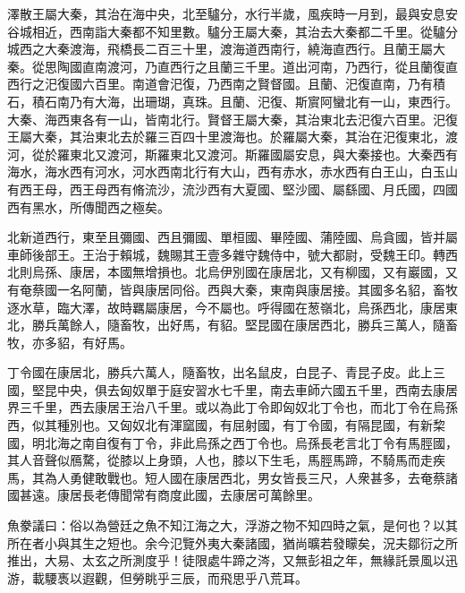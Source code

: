 \begin{pinyinscope}
澤散王屬大秦，其治在海中央，北至驢分，水行半歲，風疾時一月到，最與安息安谷城相近，西南詣大秦都不知里數。驢分王屬大秦，其治去大秦都二千里。從驢分城西之大秦渡海，飛橋長二百三十里，渡海道西南行，繞海直西行。且蘭王屬大秦。從思陶國直南渡河，乃直西行之且蘭三千里。道出河南，乃西行，從且蘭復直西行之汜復國六百里。南道會汜復，乃西南之賢督國。且蘭、汜復直南，乃有積石，積石南乃有大海，出珊瑚，真珠。且蘭、汜復、斯賔阿蠻北有一山，東西行。大秦、海西東各有一山，皆南北行。賢督王屬大秦，其治東北去汜復六百里。汜復王屬大秦，其治東北去於羅三百四十里渡海也。於羅屬大秦，其治在汜復東北，渡河，從於羅東北又渡河，斯羅東北又渡河。斯羅國屬安息，與大秦接也。大秦西有海水，海水西有河水，河水西南北行有大山，西有赤水，赤水西有白王山，白玉山有西王母，西王母西有脩流沙，流沙西有大夏國、堅沙國、屬繇國、月氏國，四國西有黑水，所傳聞西之極矣。

北新道西行，東至且彌國、西且彌國、單桓國、畢陸國、蒲陸國、烏貪國，皆并屬車師後部王。王治于賴城，魏賜其王壹多雜守魏侍中，號大都尉，受魏王印。轉西北則烏孫、康居，本國無增損也。北烏伊別國在康居北，又有柳國，又有巖國，又有奄蔡國一名阿蘭，皆與康居同俗。西與大秦，東南與康居接。其國多名貂，畜牧逐水草，臨大澤，故時羈屬康居，今不屬也。呼得國在葱嶺北，烏孫西北，康居東北，勝兵萬餘人，隨畜牧，出好馬，有貂。堅昆國在康居西北，勝兵三萬人，隨畜牧，亦多貂，有好馬。

丁令國在康居北，勝兵六萬人，隨畜牧，出名鼠皮，白昆子、青昆子皮。此上三國，堅昆中央，俱去匈奴單于庭安習水七千里，南去車師六國五千里，西南去康居界三千里，西去康居王治八千里。或以為此丁令即匈奴北丁令也，而北丁令在烏孫西，似其種別也。又匈奴北有渾窳國，有屈射國，有丁令國，有隔昆國，有新棃國，明北海之南自復有丁令，非此烏孫之西丁令也。烏孫長老言北丁令有馬脛國，其人音聲似鴈騖，從膝以上身頭，人也，膝以下生毛，馬脛馬蹄，不騎馬而走疾馬，其為人勇健敢戰也。短人國在康居西北，男女皆長三尺，人衆甚多，去奄蔡諸國甚遠。康居長老傳聞常有商度此國，去康居可萬餘里。

魚豢議曰：俗以為營廷之魚不知江海之大，浮游之物不知四時之氣，是何也？以其所在者小與其生之短也。余今氾覽外夷大秦諸國，猶尚曠若發矇矣，況夫鄒衍之所推出，大易、太玄之所測度乎！徒限處牛蹄之涔，又無彭祖之年，無緣託景風以迅游，載騕褭以遐觀，但勞眺乎三辰，而飛思乎八荒耳。


\end{pinyinscope}